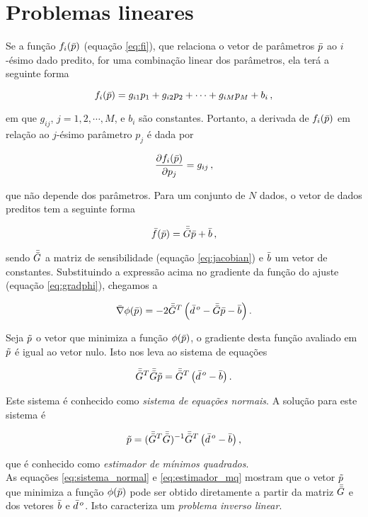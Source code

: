 \section{Problemas lineares}

Se a função $f_i(\bar{p})$ (equação \ref{eq:fi}), que relaciona o vetor de
parâmetros $\bar{p}$ ao $i$-ésimo dado predito, for uma combinação linear dos
parâmetros, ela terá a seguinte forma

\begin{equation}
f_i(\bar{p}) = g_{i1}p_1 + g_{i2}p_2 + \dotsb + g_{iM}p_M + b_i \thinspace ,
\label{eq:comb_linear}
\end{equation}

\noindent em que $g_{ij}$, $j = 1, 2, \cdots, M$, e $b_i$ são constantes.
Portanto, a derivada de $f_i(\bar{p})$ em relação ao $j$-ésimo parâmetro
$p_j$ é dada por

\begin{equation}
\dfrac{\partial f_i(\bar{p})}{\partial p_j} = g_{ij} \thinspace ,
\end{equation}

\noindent que não depende dos parâmetros. Para um conjunto de $N$ dados, o vetor
de dados preditos tem a seguinte forma

\begin{equation}
\bar{f}(\bar{p}) = \bar{\bar{G}}\bar{p} + \bar{b} \thinspace ,
\end{equation}

\noindent sendo $\bar{\bar{G}}$ a matriz de sensibilidade (equação \ref{eq:jacobian})
e $\bar{b}$ um vetor de constantes.
Substituindo a expressão acima no gradiente da função do ajuste (equação
\ref{eq:gradphi}), chegamos a

\begin{equation}
\bar{\nabla}\phi(\bar{p}) = -2\bar{\bar{G}}^T \left(\bar{d}^{\thinspace o} -
    \bar{\bar{G}}\bar{p} - \bar{b} \right).
\end{equation}

\indent Seja $\tilde{p}$ o vetor que minimiza a função $\phi(\bar{p})$, o
gradiente desta função avaliado em $\tilde{p}$ é igual ao vetor nulo.
Isto nos leva ao sistema de equações

\begin{equation}
\bar{\bar{G}}^T\bar{\bar{G}}\tilde{p} = \bar{\bar{G}}^T\left(\bar{d}^{\thinspace o} - \bar{b} \right).
\label{eq:sistema_normal}
\end{equation}

\noindent Este sistema é conhecido como {\it sistema de equações normais}. A
solução para este sistema é

\begin{equation}
\tilde{p} = (\bar{\bar{G}}^T\bar{\bar{G}})^{-1} \bar{\bar{G}}^T
    \left(\bar{d}^{\thinspace o} - \bar{b} \right),
\label{eq:estimador_mq}
\end{equation}

\noindent que é conhecido como {\it estimador de mínimos quadrados}.
\\
\indent As equações \ref{eq:sistema_normal} e \ref{eq:estimador_mq} mostram que 
o vetor $\tilde{p}$ que minimiza a função $\phi(\bar{p})$ pode ser
obtido diretamente a partir da matriz $\bar{\bar{G}}$ e dos vetores $\bar{b}$ e
$\bar{d}^{\thinspace o}$. Isto caracteriza um {\it problema inverso linear}.
